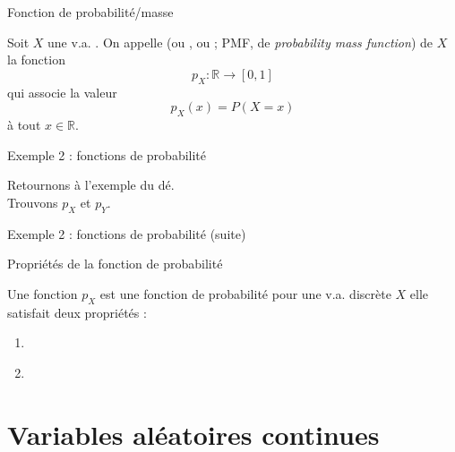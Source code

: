 \documentclass{BeamerTemplate}
\newcommand{\cibleReponse}{}
\newcommand{\lienreponse}[1]{\gdef\cibleReponse{#1}}
\begin{document}
\begin{frame}[t]{Fonction de probabilité/masse}

 \begin{defn}{}
  Soit $X$ une v.a. . On appelle  (ou ,
  ou ; PMF, de \textit{probability mass function}) de $X$ la fonction
  $$p_X:\mathbb{R}\to[0,1]$$ qui associe la valeur
  $$p_X(x)=P(X=x)$$
  à tout $x\in \mathbb{R}$.
 \end{defn}

\end{frame}




\begin{frame}[t,label=ex2pmf]{Exemple 2 : fonctions de probabilité}

Retournons à l'exemple du dé.\\
Trouvons $p_X$ et $p_Y$.

\lienreponse{rep-ex1}
\end{frame}


\begin{frame}[t]{Exemple 2 : fonctions de probabilité (suite)}

\end{frame}



\begin{frame}[t,label=proppmf]{Propriétés de la fonction de probabilité}

Une fonction $p_X$ est une fonction de probabilité pour une v.a. discrète $X$  elle satisfait deux propriétés :

\vspace{0.2 in}

\begin{enumerate}
 \item $ $
 \vspace{0.3 in}
 \item $ $
\end{enumerate}

\lienreponse{rep-ex1}
\end{frame}

\section{Variables aléatoires continues}
\end{document}
